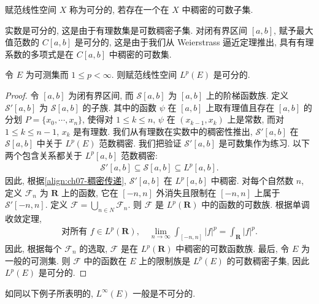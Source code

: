 \documentclass[../../main.tex]{subfiles}
\begin{document}
\begin{definition}[可分]\label{definition:ch07-可分}
赋范线性空间 $X$ 称为可分的, 若存在一个在 $X$ 中稠密的可数子集.
\end{definition}

实数是可分的, 这是由于有理数集是可数稠密子集. 对闭有界区间 $[a,b]$, 赋予最大值范数的 $C[a,b]$ 是可分的, 这是由于我们从 Weierstrass 逼近定理推出, 具有有理系数的多项式是在 $C[a,b]$ 中稠密的可数集.

\begin{theorem}\label{theorem:ch07-Lp可分}
令 $E$ 为可测集而 $1\leqslant p<\infty$. 则赋范线性空间 $L^{p}(E)$ 是可分的.
\end{theorem}

\begin{proof}
令 $[a,b]$ 为闭有界区间, 而 $\mathcal{S}[a,b]$ 为 $[a,b]$ 上的阶梯函数族. 定义 $\mathcal{S}'[a,b]$ 为 $\mathcal{S}[a,b]$ 的子族. 其中的函数 $\psi$ 在 $[a,b]$ 上取有理值且存在 $[a,b]$ 的分划 $P=\{x_{0},\cdots,x_{n}\}$, 使得对 $1\leqslant k\leqslant n$, $\psi$ 在 $(x_{k-1},x_{k})$ 上是常数, 而对 $1\leqslant k\leqslant n-1$, $x_{k}$ 是有理数. 我们从有理数在实数中的稠密性推出, $\mathcal{S}'[a,b]$ 在 $\mathcal{S}[a,b]$ 中关于 $L^{p}(E)$ 范数稠密. 我们把验证 $\mathcal{S}'[a,b]$ 是可数集作为练习. 以下两个包含关系都关于 $L^{p}[a,b]$ 范数稠密:
\begin{align*}
\mathcal{S}'[a,b]\subseteq\mathcal{S}[a,b]\subseteq L^{p}[a,b].
\end{align*}
因此, 根据\eqref{align:ch07-稠密传递}, $\mathcal{S}'[a,b]$ 在 $L^{p}[a,b]$ 中稠密. 对每个自然数 $n$, 定义 $\mathcal{F}_{n}$ 为 $\mathbf{R}$ 上的函数, 它在 $[-n,n]$ 外消失且限制在 $[-n,n]$ 上属于 $\mathcal{S}'[-n,n]$. 定义 $\mathcal{F}=\bigcup_{n\in N}\mathcal{F}_{n}$. 则 $\mathcal{F}$ 是 $L^{p}(\mathbf{R})$ 中的函数的可数族. 根据单调收敛定理,
\begin{align*}
\text{对所有 }f\in L^{p}(\mathbf{R}),\quad\lim_{n\to\infty}\int_{[-n,n]}|f|^{p}=\int_{\mathbf{R}}|f|^{p}.
\end{align*}
因此, 根据每个 $\mathcal{F}_{n}$ 的选取, $\mathcal{F}$ 是在 $L^{p}(\mathbf{R})$ 中稠密的可数函数族. 最后, 令 $E$ 为一般的可测集. 则 $\mathcal{F}$ 中的函数在 $E$ 上的限制族是 $L^{p}(E)$ 的可数稠密子集, 因此 $L^{p}(E)$ 是可分的.
\end{proof}

如同以下例子所表明的, $L^{\infty}(E)$ 一般是不可分的.
\end{document}
